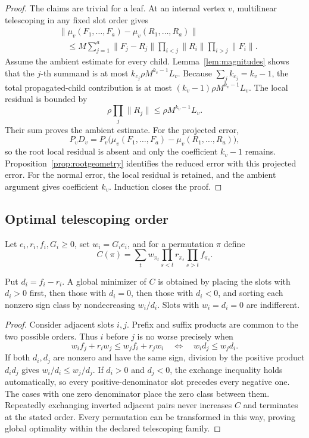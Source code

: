 \begin{proof}
The claims are trivial for a leaf. At an internal vertex \(v\),
multilinear telescoping in any fixed slot order gives
\begin{align*}
 &\lVert\mu_v(F_1,\ldots,F_a)-\mu_v(R_1,\ldots,R_a)\rVert\\
 &\quad\le
 M\sum_{j=1}^a \lVert F_j-R_j\rVert
 \prod_{i<j}\lVert R_i\rVert
 \prod_{i>j}\lVert F_i\rVert.
\end{align*}
Assume the ambient estimate for every child.
Lemma~\ref{lem:magnitudes} shows that the \(j\)-th summand is at most
\(k_{c_j}\rho M^{k_v-1}L_v\). Because
\(\sum_j k_{c_j}=k_v-1\), the total propagated-child contribution is at
most \((k_v-1)\rho M^{k_v-1}L_v\). The local residual is bounded by
\[
 \rho\prod_j\lVert R_j\rVert
 \le \rho M^{k_v-1}L_v.
\]
Their sum proves the ambient estimate. For the projected error,
\[
 P_vD_v=P_v\bigl(\mu_v(F_1,\ldots,F_a)
                  -\mu_v(R_1,\ldots,R_a)\bigr),
\]
so the root local residual is absent and only the coefficient \(k_v-1\)
remains. Proposition~\ref{prop:rootgeometry} identifies the reduced error
with this projected error. For the normal error, the local residual is
retained, and the ambient argument gives coefficient \(k_v\). Induction
closes the proof.
\end{proof}

\subsection{Optimal telescoping order}

Let \(e_i,r_i,f_i,G_i\ge0\), set \(w_i=G_ie_i\), and for a permutation
\(\pi\) define
\[
 C(\pi)=\sum_t w_{\pi_t}
 \prod_{s<t}r_{\pi_s}\prod_{s>t}f_{\pi_s}.
\]

\begin{theorem}
\label{thm:ordering-full}
Put \(d_i=f_i-r_i\). A global minimizer of \(C\) is obtained by placing
the slots with \(d_i>0\) first, then those with \(d_i=0\), then those with
\(d_i<0\), and sorting each nonzero sign class by nondecreasing
\(w_i/d_i\). Slots with \(w_i=d_i=0\) are indifferent.
\end{theorem}

\begin{proof}
Consider adjacent slots \(i,j\). Prefix and suffix products are common to
the two possible orders. Thus \(i\) before \(j\) is no worse precisely when
\[
 w_if_j+r_iw_j\le w_jf_i+r_jw_i
 \quad\Longleftrightarrow\quad
 w_id_j\le w_jd_i.
\]
If both \(d_i,d_j\) are nonzero and have the same sign, division by the
positive product \(d_id_j\) gives \(w_i/d_i\le w_j/d_j\). If \(d_i>0\)
and \(d_j<0\), the exchange inequality holds automatically, so every
positive-denominator slot precedes every negative one. The cases with one
zero denominator place the zero class between them. Repeatedly exchanging
inverted adjacent pairs never increases \(C\) and terminates at the stated
order. Every permutation can be transformed in this way, proving global
optimality within the declared telescoping family.
\end{proof}

